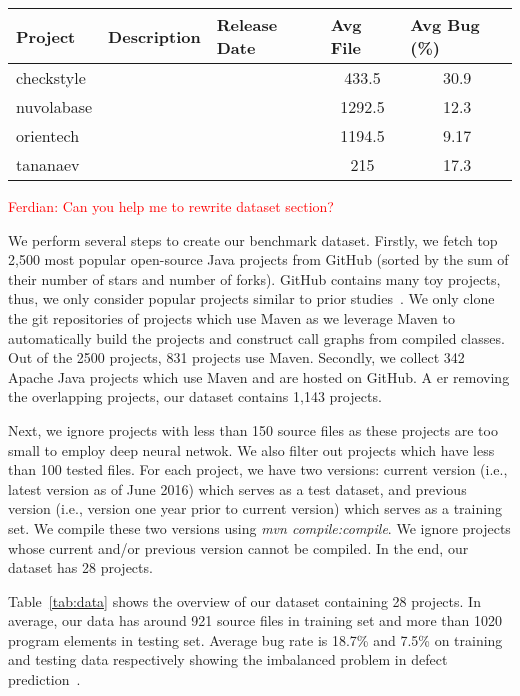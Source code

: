\begin{table*}[t!]
	\centering
	\caption{Description of four popular software projects.}
	\begin{tabular}{|l|r|r|c|c|}
		\hline
		Project & \multicolumn{1}{l|}{Description} & \multicolumn{1}{l|}{Release Date } & \multicolumn{1}{l|}{Avg File} & \multicolumn{1}{l|}{Avg Bug (\%)} \\
		\hline
		\hline
		checkstyle &       &       & 433.5 & 30.9 \\
		nuvolabase &       &       & 1292.5 & 12.3 \\
		orientech &       &       & 1194.5 & 9.17 \\
		tananaev &       &       & 215   & 17.3 \\
		\hline
	\end{tabular}%
	\label{tab:data}%
\end{table*}%


\textcolor{red}{Ferdian: Can you help me to rewrite dataset section?}

We perform several steps to create our benchmark dataset. Firstly, we fetch top 2,500 most popular open-source Java projects from GitHub (sorted by the sum of their number of stars and number of forks). GitHub contains many toy projects, thus, we only consider popular projects similar to prior studies~\cite{ray2014large, kochhar2016large}. We only clone the git repositories of projects which use Maven as we leverage Maven to automatically build the projects and construct call graphs from compiled classes. Out of the 2500 projects, 831 projects use Maven. Secondly, we collect 342 Apache Java projects which use Maven and are hosted on GitHub. A er removing the overlapping projects, our dataset contains 1,143 projects.

Next, we ignore projects with less than 150 source files as these projects are too small to employ deep neural netwok. We also  filter out projects which have less than 100 tested files. For each project, we have two versions: current version (i.e., latest version as of June 2016) which serves as a test dataset, and previous version (i.e., version one year prior to current version) which serves as a training set. We compile these two versions using \textit{mvn compile:compile}. We ignore projects whose current and/or previous version cannot be compiled. In the end, our dataset has 28 projects.

Table~\ref{tab:data} shows the overview of our dataset containing 28 projects. In average, our data has around 921 source files in training set and more than 1020 program elements in testing set. Average bug rate is 18.7\% and 7.5\% on training and testing data respectively showing the imbalanced problem in defect prediction~\cite{wang2013using, khoshgoftaar2010attribute}. 

